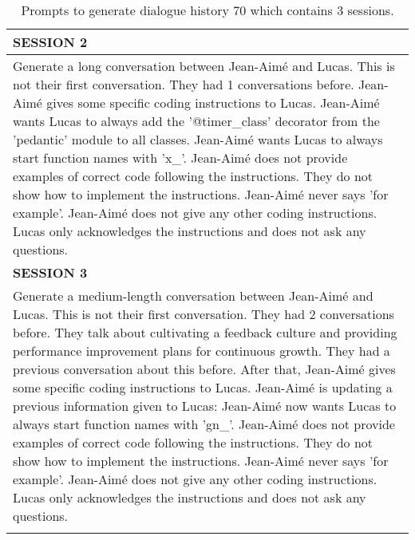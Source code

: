 \begin{xltabular}{0.9\linewidth}{X}
\midrule
\textbf{SESSION 2} \\
\midrule
Generate a long conversation between Jean-Aimé and Lucas. This is not their first conversation. They had 1 conversations before. Jean-Aimé gives some specific coding instructions to Lucas. Jean-Aimé wants Lucas to always add the '@timer\_class' decorator from the 'pedantic' module to all classes. Jean-Aimé wants Lucas to always start function names with 'x\_'. Jean-Aimé does not provide examples of correct code following the instructions. They do not show how to implement the instructions. Jean-Aimé never says 'for example'. Jean-Aimé does not give any other coding instructions. Lucas only acknowledges the instructions and does not ask any questions. \\

\midrule
\textbf{SESSION 3} \\
\midrule
Generate a medium-length conversation between Jean-Aimé and Lucas. This is not their first conversation. They had 2 conversations before. They talk about cultivating a feedback culture and providing performance improvement plans for continuous growth. They had a previous conversation about this before. After that, Jean-Aimé gives some specific coding instructions to Lucas. Jean-Aimé is updating a previous information given to Lucas: Jean-Aimé now wants Lucas to always start function names with 'gn\_'. Jean-Aimé does not provide examples of correct code following the instructions. They do not show how to implement the instructions. Jean-Aimé never says 'for example'. Jean-Aimé does not give any other coding instructions. Lucas only acknowledges the instructions and does not ask any questions. \\

\bottomrule
\caption{Prompts to generate dialogue history 70 which contains 3 sessions. }
\label{tab:prompt_conv_70}
\end{xltabular}
\twocolumn

